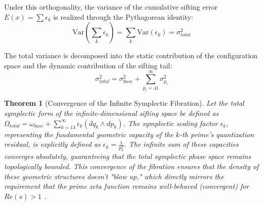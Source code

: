 \documentclass[sn-mathphys-num, pdflatex, referee]{sn-jnl}
\newtheorem{theorem}{Theorem}[section]
\begin{document}
Under this orthogonality, the variance of the cumulative sifting error $E(x) = \sum \epsilon_k$ is realized through the Pythagorean identity:
\begin{equation}
\text{Var}\left( \sum_{k} \epsilon_k \right) = \sum_{k} \text{Var}(\epsilon_k) = \sigma_{total}^2
\end{equation}

The total variance is decomposed into the static contribution of the configuration space and the dynamic contribution of the sifting tail:
\begin{equation}
\sigma_{total}^2 = \sigma_{base}^2 + \sum_{p_i = 41}^{\infty} \sigma_{p_i}^2
\end{equation}

\begin{theorem}[Convergence of the Infinite Symplectic Fibration]
\label{the:infinite_fibration}
Let the total symplectic form of the infinite-dimensional sifting space be defined as $\Omega_{total} = \omega_{base} + \sum_{k=13}^{\infty} \epsilon_k (dq_k \wedge dp_k)$. The symplectic scaling factor $\epsilon_k$, representing the fundamental geometric capacity of the $k$-th prime's quantization residual, is explicitly defined as $\epsilon_k = \frac{1}{p_k^2}$. The infinite sum of these capacities converges absolutely, guaranteeing that the total symplectic phase space remains topologically bounded. This convergence of the fibration ensures that the density of these geometric structures doesn't "blow up," which directly mirrors the requirement that the prime zeta function remains well-behaved (convergent) for $Re(s) > 1$ \cite{froberg1968prime}.
\end{theorem}
\end{document}
